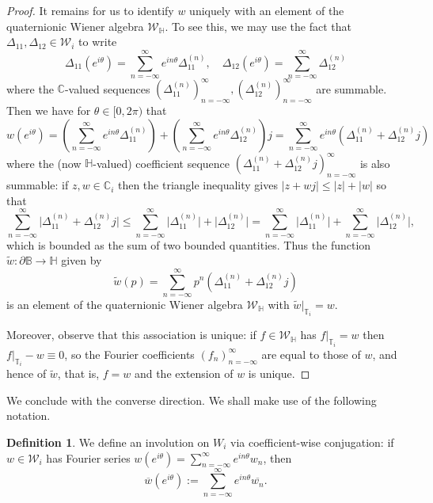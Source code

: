 \documentclass[11pt,reqno]{amsart}
\def\th{\theta}
\def\D{\Delta}
\def\CC{\mathbb{C}}
\def\BB{\mathbb{B}}
\def\TT{\mathbb{T}}
\def\HH{\mathbb{H}}
\theoremstyle{definition}
\newtheorem{definition}[theorem]{Definition}
\numberwithin{equation}{section}
\renewcommand{\tilde}{\widetilde}
\begin{document}
\begin{proof}
    It remains for us to identify \(w\) uniquely with an element of the quaternionic Wiener algebra \(\mathscr{W}_\HH\). To see this, we may use the fact that \(\D_{11}, \D_{12} \in \mathscr{W}_i\) to write
    \[
        \D_{11}(e^{i\th}) = \sum_{n=-\infty}^{\infty} e^{in\th} \D_{11}^{(n)}, \quad \D_{12}(e^{i\th}) = \sum_{n=-\infty}^{\infty} \D_{12}^{(n)}
    \]
    where the \(\CC\)-valued sequences \((\D_{11}^{(n)})_{n=-\infty}^{\infty}, (\D_{12}^{(n)})_{n=-\infty}^{\infty}\) are summable. Then we have for \(\th \in [0,2\pi)\) that
    \[
        w(e^{i\th}) = \left(\sum_{n=-\infty}^{\infty} e^{in\th} \D_{11}^{(n)}\right) + \left(\sum_{n=-\infty}^{\infty} e^{in\th} \D_{12}^{(n)}\right) j = \sum_{n=-\infty}^{\infty} e^{in\th} (\D_{11}^{(n)} + \D_{12}^{(n)}j)
    \]
    where the (now \(\HH\)-valued) coefficient sequence \((\D_{11}^{(n)} + \D_{12}^{(n)}j)_{n=-\infty}^{\infty}\) is also summable: if \(z,w \in \CC_i\) then the triangle inequality gives \(\lvert z + wj \rvert \leq \lvert z \rvert + \lvert w \rvert\) so that
    \[
        \sum_{n=-\infty}^{\infty} \lvert \D_{11}^{(n)} + \D_{12}^{(n)}j \rvert \leq \sum_{n=-\infty}^{\infty} \lvert \D_{11}^{(n)} \rvert + \lvert \D_{12}^{(n)} \rvert = \sum_{n=-\infty}^{\infty} \lvert \D_{11}^{(n)} \rvert + \sum_{n=-\infty}^{\infty} \lvert \D_{12}^{(n)} \rvert,
    \]
    which is bounded as the sum of two bounded quantities. Thus the function \(\tilde{w} : \partial\BB \to \HH\) given by
    \[
        \tilde{w}(p) = \sum_{n=-\infty}^{\infty} p^n (\D_{11}^{(n)} + \D_{12}^{(n)}j)
    \]
    is an element of the quaternionic Wiener algebra \(\mathscr{W}_\HH\) with \(\tilde{w}\vert_{\TT_i} = w\).

    Moreover, observe that this association is unique: if \(f \in \mathscr{W}_\HH\) has \(f\vert_{\TT_i} = w\) then \(f\vert_{\TT_i} - w \equiv 0\), so the Fourier coefficients \((f_n)_{n=-\infty}^{\infty}\) are equal to those of \(w\), and hence of \(\tilde{w}\), that is, \(f = w\) and the extension of \(w\) is unique.
\end{proof}

We conclude with the converse direction. We shall make use of the following notation.

\begin{definition}
	We define an involution on \(W_i\) via coefficient-wise conjugation: if \(w \in \mathscr{W}_i\) has Fourier series \(w(e^{i\th}) = \sum_{n=-\infty}^{\infty} e^{i n \th} w_n\), then
	\[
		\overline{w}(e^{i\th}) := \sum_{n=-\infty}^{\infty} e^{i n \th} \overline{w_n}.
	\]
\end{definition}
\end{document}

